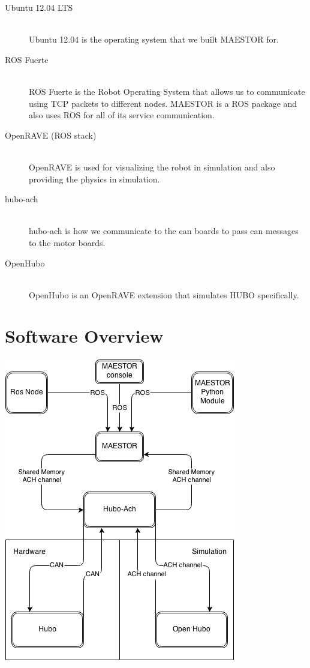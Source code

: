 \documentclass[12pt]{article}
\begin{document}
\begin{description}
	\item[Ubuntu 12.04 LTS] \hfill \\
		Ubuntu 12.04 is the operating system that we built MAESTOR for. \\
	\item[ROS Fuerte] \hfill \\
		ROS Fuerte is the Robot Operating System that allows us to communicate using TCP packets to different nodes. MAESTOR is a ROS package and also uses ROS for all of its service communication. \\
		
	\item [OpenRAVE (ROS stack)] \hfill \\
		OpenRAVE is used for visualizing the robot in simulation and also providing the physics in simulation. 
	\item [hubo-ach]\hfill \\
		hubo-ach is how we communicate to the can boards to pass can messages to the motor boards.
	\item [OpenHubo]	\hfill \\
		OpenHubo is an OpenRAVE extension that simulates HUBO specifically. 
\end{description}

\section{Software Overview}
\begin{center}
	\includegraphics[scale=.75]{Highlevel}
\end{center}
\end{document}
